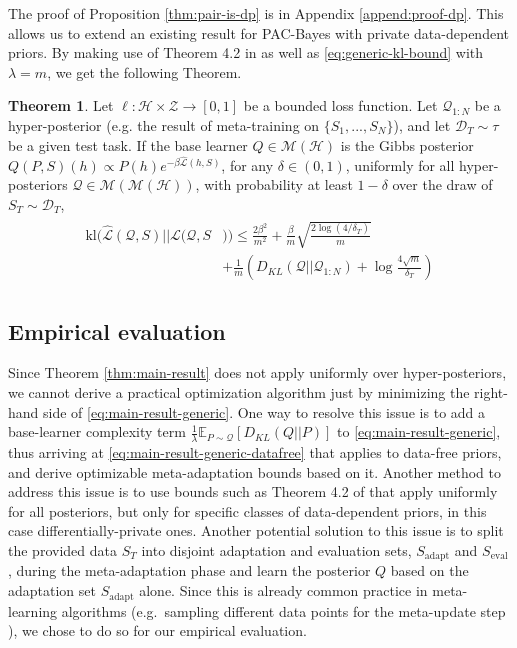 \documentclass[letterpaper]{article} %
\theoremstyle{definition}
\newtheorem{theorem}{Theorem}[section]
\newcommand{\Expect}[2]{\mathbb{E}_{#1}\left [#2 \right ]}
\begin{document}
The proof of Proposition \ref{thm:pair-is-dp} is in Appendix \ref{append:proof-dp}. This  allows us to extend an existing result for PAC-Bayes with private data-dependent priors.
By making use of Theorem 4.2 in \citet{Dziugaite2018} as well as  \eqref{eq:generic-kl-bound} with $\lambda=m$, we get the following Theorem.

\begin{theorem} \label{thm:kl-main-result}
	Let $\ell:\mathcal{H}\times \mathcal{Z}\rightarrow [0,1]$ be a bounded loss function.
	Let $\mathcal{Q}_{1:N}$ be a hyper-posterior (e.g. the result of meta-training on $\{S_1,...,S_N\}$), and let $\mathcal{D}_T\sim \tau$ be a given test task. 
	If the base learner $Q\in \mathcal{M}(\mathcal{H})$ is the Gibbs posterior $Q(P, S)(h)\propto P(h)e^{-\beta\hat{\mathcal{L}}(h, S)}$, 
	for any $\delta\in(0,1)$, uniformly for all hyper-posteriors $\mathcal{Q}\in \mathcal{M}(\mathcal{M}(\mathcal{H}))$, with probability at least $1-\delta$ over the draw of $S_T\sim \mathcal{D}_T$,
%
	\begin{align*} 
	\begin{split}
	\mathrm{kl}(\hat{\mathcal{L}}(\mathcal{Q},S)||\mathcal{L}(\mathcal{Q},S&))\leq \frac{2\beta^2}{m^2}+\frac{\beta}{m}\sqrt{\frac{2\log (4/\delta_T)}{m}} \\
	&+\frac{1}{m}\left (D_{KL}(\mathcal{Q}||\mathcal{Q}_{1:N})+\log\frac{4\sqrt{m}}{\delta_T} \right )
	\end{split}
	\end{align*}
	
\end{theorem}

\subsection{Empirical evaluation}

Since Theorem \ref{thm:main-result} does not apply uniformly over hyper-posteriors, we cannot derive a practical optimization algorithm just by minimizing the right-hand side of  \eqref{eq:main-result-generic}. 
One way to resolve this issue is to add a base-learner complexity term $\frac{1}{\lambda}\Expect{P\sim \mathcal{Q}}{D_{KL}(Q||P)}$ to  \eqref{eq:main-result-generic}, thus arriving at \eqref{eq:main-result-generic-datafree} that applies to data-free priors, and derive optimizable meta-adaptation bounds based on it.
Another method to address this issue is to use bounds such as Theorem 4.2 of \citet{Dziugaite2018} that apply uniformly for all posteriors, but only for specific classes of data-dependent priors, in this case differentially-private ones.
Another potential solution to this issue is to split the provided data $S_T$ into disjoint adaptation and evaluation sets, $S_{\mathrm{adapt}}$ and $S_{\mathrm{eval}}$, during the meta-adaptation phase and learn the posterior $Q$ based on the adaptation set $S_{\mathrm{adapt}}$ alone. Since this is already common practice in meta-learning algorithms (e.g.\ sampling different data points for the meta-update step ), we chose to do so for our empirical evaluation. %
\end{document}

